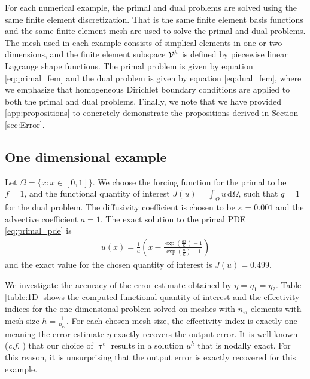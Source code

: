 For each numerical example, the primal and dual problems are solved
using the same finite element discretization. That is the same
finite element basis functions and the same finite element mesh
are used to solve the primal and dual problems. The mesh used in
each example consists
of simplical elements in one or two dimensions, and the finite element
subspace $\mathcal{V}^h$ is defined by piecewise linear Lagrange shape functions.
The primal problem is given by equation \eqref{eq:primal_fem} and the
dual problem is given by equation \eqref{eq:dual_fem}, where we
emphasize that homogeneous Dirichlet boundary conditions are applied
to both the primal and dual problems. Finally, we note that
we have provided \ref{app:propositions} to concretely demonstrate
the propositions derived in Section \ref{sec:Error}.

\subsection{One dimensional example}

Let $\Omega = \{ x : x \in [0,1] \}$. We choose the forcing
function for the primal to be $f = 1$, and the functional quantity
of interest $J(u) = \int_{\Omega} u \, \text{d} \Omega$, such that $q = 1$
for the dual problem. The diffusivity coefficient is chosen to be
$\kappa = 0.001$ and the advective coefficient $a = 1$.
The exact solution to the primal PDE \eqref{eq:primal_pde} is
%
\begin{gather}
u(x) = \frac{1}{a}
\left( x -
\frac{\exp(\frac{a x}{\kappa}) - 1}
{\exp(\frac{a}{\kappa}) - 1}
\right)
\label{eq:ex1_exact}
\end{gather}
%
and the exact value for the chosen quantity of interest is
$J(u) = 0.499$.

We investigate the accuracy of the error estimate obtained
by $\eta = \eta_1 = \eta_2$.
Table \ref{table:1D} shows the computed functional quantity of
interest and the effectivity indices for the one-dimensional
problem solved on meshes with $n_{el}$ elements with mesh size
$h = \frac{1}{n_{el}}$. For each chosen mesh size, the effectivity
index is exactly one meaning the error estimate $\eta$ exactly
recovers the output error. It is well known
(\emph{c.f.} \cite{hughes1998variational}) that our choice of
$\uptau^e$ results in a solution $u^h$ that is nodally exact.
For this reason, it is unsurprising that the output error is
exactly recovered for this example.

